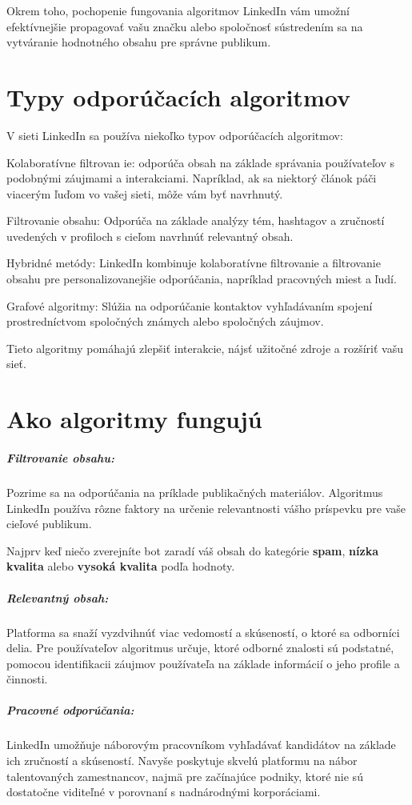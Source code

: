 \documentclass[twoside,slovak,a4paper]{coursepaper}
\begin{document}
Okrem toho, pochopenie fungovania algoritmov LinkedIn vám umožní efektívnejšie propagovať vašu značku alebo spoločnosť sústredením sa na vytváranie hodnotného obsahu pre správne publikum.


\section{Typy odporúčacích algoritmov} \label{Typy}
V sieti LinkedIn sa používa niekoľko typov odporúčacích algoritmov:

Kolaboratívne filtrovan	ie: odporúča obsah na základe správania používateľov s podobnými záujmami a interakciami. Napríklad, ak sa niektorý článok páči viacerým ľuďom vo vašej sieti, môže vám byť navrhnutý.

Filtrovanie obsahu: Odporúča na základe analýzy tém, hashtagov a zručností uvedených v profiloch s cieľom navrhnúť relevantný obsah.

Hybridné metódy: LinkedIn kombinuje kolaboratívne filtrovanie a filtrovanie obsahu pre personalizovanejšie odporúčania, napríklad pracovných miest a ľudí.

Grafové algoritmy: Slúžia na odporúčanie kontaktov vyhľadávaním spojení prostredníctvom spoločných známych alebo spoločných záujmov.

Tieto algoritmy pomáhajú zlepšiť interakcie, nájsť užitočné zdroje a rozšíriť vašu sieť. ~\cite{Kohút:article}

\section{Ako algoritmy fungujú} \label{fungovanie}
\subparagraph{Filtrovanie obsahu:}
Pozrime sa na odporúčania na príklade publikačných materiálov. Algoritmus LinkedIn používa rôzne faktory na určenie relevantnosti vášho príspevku pre vaše cieľové publikum.

Najprv keď niečo zverejníte bot zaradí váš obsah do kategórie \textbf{spam}, \textbf{nízka kvalita} alebo \textbf{vysoká kvalita} podľa hodnoty. ~\cite{Terez:article}

\subparagraph{Relevantný obsah:}Platforma sa snaží vyzdvihnúť viac vedomostí a skúseností, o ktoré sa odborníci delia. Pre používateľov algoritmus určuje, ktoré odborné znalosti sú podstatné, pomocou identifikacii záujmov používateľa na základe informácií o jeho profile a činnosti.~\cite{Barnhart:article}

\subparagraph{Pracovné odporúčania:}
LinkedIn umožňuje náborovým pracovníkom vyhľadávať kandidátov na základe ich zručností a skúseností. Navyše poskytuje skvelú platformu na nábor talentovaných zamestnancov, najmä pre začínajúce podniky, ktoré nie sú dostatočne viditeľné v porovnaní s nadnárodnými korporáciami.~\cite{Rodriguez:article}
\end{document}
